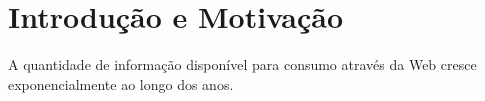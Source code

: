 \chapter{Introdução e Motivação}
A quantidade de informação disponível para consumo através da Web cresce exponencialmente ao longo dos anos.